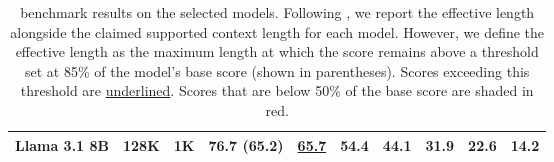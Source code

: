 \begin{table*}[ht!]
\begin{tabular}{l|cc|ccccccc}
        Llama 3.1 8B        & 128K & 1K  & 76.7 (65.2) & \underline{65.7} & 54.4 & 44.1 & \cellcolor[HTML]{faa7a7}31.9 & \cellcolor[HTML]{faa7a7}22.6 & \cellcolor[HTML]{faa7a7}14.2 \\
		\bottomrule
	\end{tabular}
	\caption{\framework benchmark results on the selected models. Following \citet{hsieh2024ruler}, we report the effective length alongside the claimed supported context length for each model. However, we define the effective length as the maximum length at which the score remains above a threshold set at 85\% of the model's base score (shown in parentheses). Scores exceeding this threshold are \underline{underlined}. Scores that are below 50\% of the base score are shaded in \colorbox{shadedRed}{red}.}
	\label{tab:models_performance}
\end{table*}

